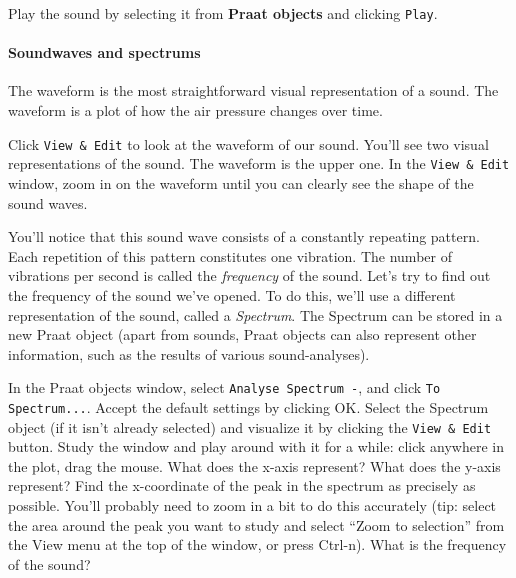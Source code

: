 \documentclass[a4paper, 9pt]{article}
\begin{document}
\begin{exercise}
\action Play the sound by selecting it from \textbf{Praat objects} and clicking \texttt{Play}.
\end{exercise}


\paragraph{Soundwaves and spectrums}\label{soundwaves-and-spectrums}

The waveform is the most straightforward visual representation of a
sound. The waveform is a plot of how the air pressure changes over time.

\begin{exercise}
\action Click \texttt{View \& Edit} to look at the waveform of our sound.
You'll see two visual representations of the sound. The waveform is the
upper one.
\action In the \texttt{View \& Edit} window, zoom in on the waveform until you can clearly see the shape of the sound waves.
\end{exercise}

You'll notice that this sound wave consists of a constantly repeating
pattern. Each repetition of this pattern constitutes one vibration. The
number of vibrations per second is called the \emph{frequency} of the
sound.
Let's try to find out the frequency of the sound we've opened. To do
this, we'll use a different representation of the sound, called a
\emph{Spectrum}. The Spectrum can be stored in a new Praat object (apart
from sounds, Praat objects can also represent other information, such as
the results of various sound-analyses).

\begin{exercise}
\action In the Praat objects window, select \texttt{Analyse Spectrum -}, and click \texttt{To Spectrum...}. Accept the default settings by clicking OK.
\action Select the Spectrum object (if it isn't already selected) and visualize it by clicking the \texttt{View \& Edit} button.
\action Study the window and play around with it for a while: click anywhere in the plot, drag the mouse. What does the x-axis represent? What does the y-axis represent?
\action Find the x-coordinate of the peak in the spectrum as precisely as possible. You'll probably need to zoom in a bit to do this accurately (tip: select the area around the peak you want to study and select ``Zoom to selection'' from the View menu at the top of the window, or press Ctrl-n). What is the frequency of the sound? 
\end{exercise}
\end{document}
